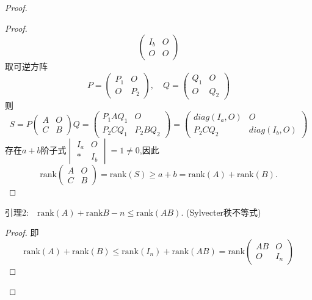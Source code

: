 \documentclass{article}
\begin{document}
\begin{enumerate}
\begin{proof}
\begin{enumerate}
\begin{proof}
\[\begin{pmatrix}
                        I_b & O\\
                        O & O
                    \end{pmatrix}
                \]
                取可逆方阵
                \[
                    P=\begin{pmatrix}
                        P_1 & O\\
                        O & P_2
                    \end{pmatrix},\quad
                    Q=\begin{pmatrix}
                        Q_1 & O\\
                        O & Q_2
                    \end{pmatrix}
                \]
                则
                \[
                    S=P\begin{pmatrix}
                        A & O\\
                        C & B
                    \end{pmatrix}Q
                    =\begin{pmatrix}
                        P_1 A Q_1 & O\\
                        P_2 C Q_1 & P_2 B Q_2
                    \end{pmatrix}
                    =\begin{pmatrix}
                        diag(I_a,O) & O\\
                        P_2 C Q_2 & diag(I_b,O)
                    \end{pmatrix}
                \]
                存在$a+b$阶子式$\begin{vmatrix} I_a & O\\ * & I_b \end{vmatrix}=1\neq 0$,因此
                \[
                    \mbox{rank}\begin{pmatrix}
                        A & O\\
                        C & B
                    \end{pmatrix}
                    =\mbox{rank}(S)\geqslant a+b =\mbox{rank}(A)+\mbox{rank}(B).
                \]
                \end{proof}
                引理2:$\quad \mbox{rank}(A)+\mbox{rank}B-n\leqslant \mbox{rank}(AB)$. (Sylvecter秩不等式)
                \begin{proof}
                即\[\mbox{rank}(A)+\mbox{rank}(B)\leqslant \mbox{rank}(I_n)+\mbox{rank}(AB)=\mbox{rank}\begin{pmatrix}AB & O \\ O & I_n \end{pmatrix}\]

\end{proof}
\end{enumerate}
\end{proof}
\end{enumerate}
\end{document}
